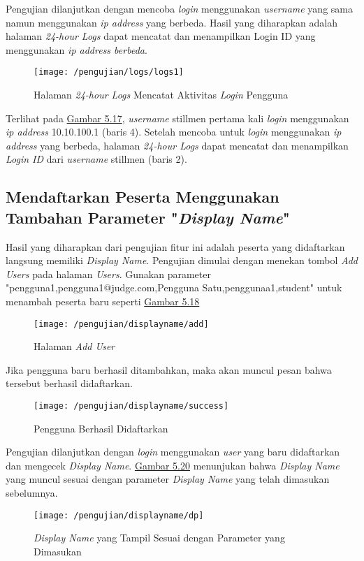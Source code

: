	Pengujian dilanjutkan dengan mencoba \textit{login} menggunakan \textit{username} yang sama namun menggunakan \textit{ip address} yang berbeda. Hasil yang diharapkan adalah halaman \textit{24-hour Logs} dapat mencatat dan menampilkan Login ID yang menggunakan \textit{ip address berbeda}.
	\begin{figure}[H]
		\centering  
		\texttt{[image: /pengujian/logs/logs1]}  
		\caption[Halaman \textit{24-hour Logs} Mencatat Aktivitas \textit{Login} Pengguna]{Halaman \textit{24-hour Logs} Mencatat Aktivitas \textit{Login} Pengguna} 
		\label{fig:logs1} 
	\end{figure}
	Terlihat pada \hyperref[fig:logs1]{Gambar 5.17}, \textit{username} stillmen pertama kali \textit{login} menggunakan \textit{ip address} 10.10.100.1 (baris 4). Setelah mencoba untuk \textit{login} menggunakan \textit{ip address} yang berbeda, halaman \textit{24-hour Logs} dapat mencatat dan menampilkan \textit{Login ID} dari \textit{username} stillmen (baris 2).
	
	\subsection{Mendaftarkan Peserta Menggunakan Tambahan Parameter "\textit{Display Name}"}
	Hasil yang diharapkan dari pengujian fitur ini adalah peserta yang didaftarkan langsung memiliki \textit{Display Name}. Pengujian dimulai dengan menekan tombol \textit{Add Users} pada halaman \textit{Users}. Gunakan parameter "pengguna1,pengguna1@judge.com,Pengguna Satu,penggunaa1,student" untuk menambah peserta baru seperti \hyperref[fig:useradd]{Gambar 5.18}
	\begin{figure}[H]
		\centering  
		\texttt{[image: /pengujian/displayname/add]}  
		\caption[Halaman \textit{Add User}]{Halaman \textit{Add User}} 
		\label{fig:useradd} 
	\end{figure}

	Jika pengguna baru berhasil ditambahkan, maka akan muncul pesan bahwa tersebut berhasil didaftarkan.
	\begin{figure}[H]
		\centering  
		\texttt{[image: /pengujian/displayname/success]}  
		\caption[Pengguna Berhasil Didaftarkan]{Pengguna Berhasil Didaftarkan} 
		\label{fig:success} 
	\end{figure}

	Pengujian dilanjutkan dengan \textit{login} menggunakan \textit{user} yang baru didaftarkan dan mengecek \textit{Display Name}. \hyperref[fig:dp]{Gambar 5.20} menunjukan bahwa \textit{Display Name} yang muncul sesuai dengan parameter \textit{Display Name} yang telah dimasukan sebelumnya.
	\begin{figure}[H]
		\centering  
		\texttt{[image: /pengujian/displayname/dp]}  
		\caption[\textit{Display Name} yang Tampil Sesuai dengan Parameter yang Dimasukan]{\textit{Display Name} yang Tampil Sesuai dengan Parameter yang Dimasukan} 
		\label{fig:dp} 
	\end{figure}

